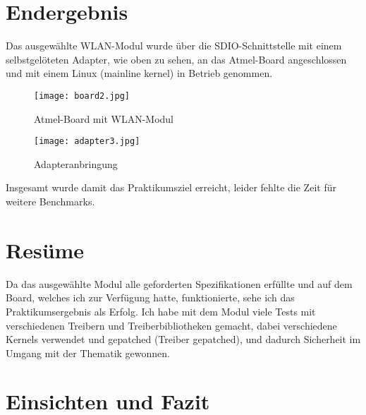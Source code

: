 \documentclass[pdftex,12pt,a4paper]{scrartcl}
\begin{document}
\section{Endergebnis}
Das ausgewählte WLAN-Modul wurde über die SDIO-Schnittstelle mit einem selbstgelöteten Adapter, wie oben zu sehen, an das Atmel-Board angeschlossen und mit einem Linux (mainline kernel) in Betrieb genommen.\\
\begin{figure}[H] %
    \centering
    \texttt{[image: board2.jpg]}
    \caption{Atmel-Board mit WLAN-Modul}
\end{figure}
\begin{figure}[H] %
    \centering
    \texttt{[image: adapter3.jpg]}
    \caption{Adapteranbringung}
\end{figure}

Insgesamt wurde damit das Praktikumsziel erreicht, leider fehlte die Zeit für weitere Benchmarks.\\
\section{Resüme}
Da das ausgewählte Modul alle geforderten Spezifikationen erfüllte und auf dem Board, welches ich zur Verfügung hatte, funktionierte, sehe ich das Praktikumsergebnis als Erfolg. Ich habe mit dem Modul viele Tests mit verschiedenen Treibern und Treiberbibliotheken gemacht, dabei verschiedene Kernels verwendet und gepatched (Treiber gepatched), und dadurch Sicherheit im Umgang mit der Thematik gewonnen.
\section{Einsichten und Fazit}
\end{document}
